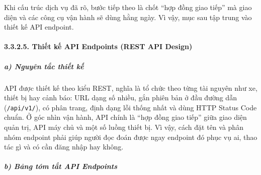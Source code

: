 \documentclass[a4paper]{extarticle}
\begin{document}
Khi cấu trúc dịch vụ đã rõ, bước tiếp theo là chốt ``hợp đồng giao
tiếp'' mà giao diện và các công cụ vận hành sẽ dùng hằng ngày. Vì vậy,
mục sau tập trung vào thiết kế API endpoint.

\paragraph{3.3.2.5. Thiết kế API Endpoints (REST API
Design)}\label{3235-thiux1ebft-kux1ebf-api-endpoints-rest-api-design}

\subparagraph{a) Nguyên tắc thiết
kế}\label{a-nguyuxean-tux1eafc-thiux1ebft-kux1ebf}

API được thiết kế theo kiểu REST, nghĩa là tổ chức theo từng tài nguyên
như xe, thiết bị hay cảnh báo: URL dạng số nhiều, gắn phiên bản ở đầu
đường dẫn (\texttt{/api/v1/}), có phân trang, định dạng lỗi thống nhất
và dùng HTTP Status Code chuẩn. Ở góc nhìn vận hành, API chính là ``hợp
đồng giao tiếp'' giữa giao diện quản trị, API máy chủ và một số
luồng thiết bị. Vì vậy, cách đặt tên và phân nhóm endpoint phải giúp
người đọc đoán được ngay endpoint đó phục vụ ai, thao tác gì và có cần
đăng nhập hay không.

\subparagraph{b) Bảng tóm tắt API
Endpoints}\label{b-bux1ea3ng-tuxf3m-tux1eaft-api-endpoints}
\end{document}
